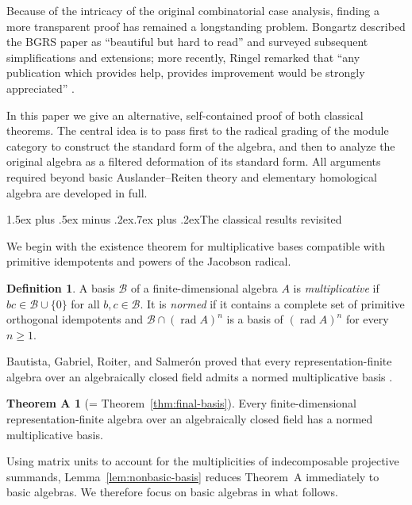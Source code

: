 \documentclass[a4paper,reqno,11pt]{amsart}
\makeatletter
\renewcommand{\subsection}{\@startsection{subsection}{2}%
  {\z@}{1.5ex plus .5ex minus .2ex}{.7ex plus .2ex}{\normalfont\bfseries}}
\theoremstyle{definition}
\newtheorem{definition}[theorem]{Definition}
\newtheorem*{theoremA}{Theorem A}
\DeclareMathOperator{\rad}{rad}
\newcommand{\B}{\mathcal B}
\makeatother
\begin{document}
Because of the intricacy of the original combinatorial case analysis, finding
a more transparent proof has remained a longstanding problem. Bongartz
described the BGRS paper as ``beautiful but hard to read''
\cite[Section~1]{BongartzSurvey} and surveyed subsequent simplifications and
extensions; more recently, Ringel remarked that ``any publication which
provides help, provides improvement would be strongly appreciated''
\cite[Section~3]{RingelVossieck}.

In this paper we give an alternative, self-contained proof of both classical
theorems. The central idea is to pass first to the radical grading of the
module category to construct the standard form of the algebra, and then to
analyze the original algebra as a filtered deformation of its standard form.
All arguments required beyond basic Auslander--Reiten theory and elementary
homological algebra are developed in full.

\subsection{The classical results revisited}
\label{subsec:intro-results}

We begin with the existence theorem for multiplicative bases compatible with
primitive idempotents and powers of the Jacobson radical.

\begin{definition}
\label{def:normed-multiplicative-basis}
A basis $\B$ of a finite-dimensional algebra $A$ is \emph{multiplicative} if
$bc\in\B\cup\{0\}$ for all $b,c\in\B$. It is \emph{normed} if it contains
a complete set of primitive orthogonal idempotents and
$\B\cap(\rad A)^n$ is a basis of $(\rad A)^n$ for every $n\geq1$.
\end{definition}

Bautista, Gabriel, Roiter, and Salmer\'on proved that every
representation-finite algebra over an algebraically closed field admits a
normed multiplicative basis \cite[Sections~1.2 and~1.12]{BGRS}.

\begin{theoremA}[= Theorem~\ref{thm:final-basis}]
Every finite-dimensional representation-finite algebra over an algebraically
closed field has a normed multiplicative basis.
\end{theoremA}

Using matrix units to account for the multiplicities of indecomposable
projective summands, Lemma~\ref{lem:nonbasic-basis} reduces Theorem~A
immediately to basic algebras. We therefore focus on basic algebras in what
follows.
\end{document}
